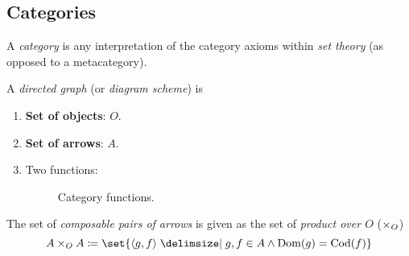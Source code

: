 \subsection{Categories}

\begin{definition}[Category]
    A \textit{category} is any interpretation of the category axioms within \textit{set theory} (as opposed to a metacategory).
\end{definition}

\begin{definition}
    A \textit{directed graph} (or \textit{diagram scheme}) is
    \begin{enumerate}
        \item \textbf{Set of objects}: $O$.
        \item \textbf{Set of arrows}: $A$.
        \item Two functions:
        \begin{figure}[H]
            \centering
            \caption{Category functions.}
            \label{fig:category-functions}
        \end{figure}
    \end{enumerate}
    
    The set of \textit{composable pairs of arrows} is given as the set of \textit{product over $O$} ($\times_{O}$)
    \begin{equation}
        A \ProductOver{O} A \coloneqq \set{ 
            \langle g, f \rangle \given
            g, f \in A \land \Domain{g} = \Codomain{f}
        }
    \end{equation}
\end{definition}

